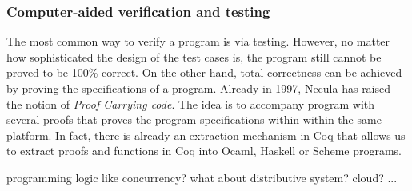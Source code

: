 \subsubsection{Computer-aided verification and testing}
\par The most common way to verify a program is via testing. However,
no matter how sophisticated the design of the test cases is, the
program still cannot be proved to be 100\% correct. On the other
hand, total correctness can be achieved by proving the specifications
of a program. Already in 1997, Necula \cite{necula1997} has raised the
notion of \textit{Proof Carrying code}. The idea is to accompany
program with several proofs that proves the program specifications
within within the same platform. In fact, there is already an
extraction mechanism \cite{letouzey2008} in Coq that allows us to
extract proofs and functions in Coq into Ocaml, Haskell or Scheme
programs. 

\par programming logic like concurrency? what about distributive
system? cloud?  ... 
